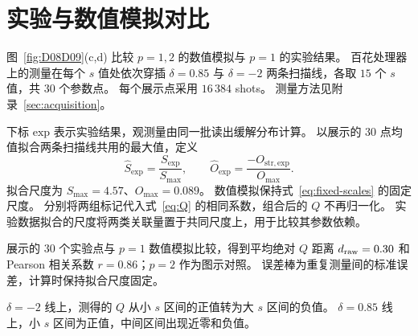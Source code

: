 \section{实验与数值模拟对比}
\label{sec:comparison}

图~\ref{fig:D08D09}(c,d) 比较 $p=1,2$ 的数值模拟与 $p=1$ 的实验结果。
百花处理器上的测量在每个 $s$ 值处依次穿插 $\delta=0.85$ 与 $\delta=-2$ 两条扫描线，各取 $15$ 个 $s$ 值，共 $30$ 个参数点。
每个展示点采用 $16\,384$ shots。
测量方法见附录~\ref{sec:acquisition}。

下标 $\mathrm{exp}$ 表示实验结果，观测量由同一批读出缓解分布计算。
以展示的 $30$ 点均值拟合两条扫描线共用的最大值，定义
\begin{equation}
\hat S_{\mathrm{exp}}=\frac{S_{\mathrm{exp}}}{S_{\max}},\qquad
\hat O_{\mathrm{exp}}=\frac{-O_{\mathrm{str},\mathrm{exp}}}{O_{\max}}.
\label{eq:hardware-scales}
\end{equation}
拟合尺度为 $S_{\max}=4.57$、$O_{\max}=0.089$。
数值模拟保持式~\eqref{eq:fixed-scales} 的固定尺度。
分别将两组标记代入式~\eqref{eq:Q} 的相同系数，组合后的 $Q$ 不再归一化。
实验数据拟合的尺度将两类关联量置于共同尺度上，用于比较其参数依赖。

展示的 $30$ 个实验点与 $p=1$ 数值模拟比较，得到平均绝对 $Q$ 距离 $d_{\rm raw}=0.30$ 和 Pearson 相关系数 $r=0.86$；$p=2$ 作为图示对照。
误差棒为重复测量间的标准误差，计算时保持拟合尺度固定。

$\delta=-2$ 线上，测得的 $Q$ 从小 $s$ 区间的正值转为大 $s$ 区间的负值。
$\delta=0.85$ 线上，小 $s$ 区间为正值，中间区间出现近零和负值。
